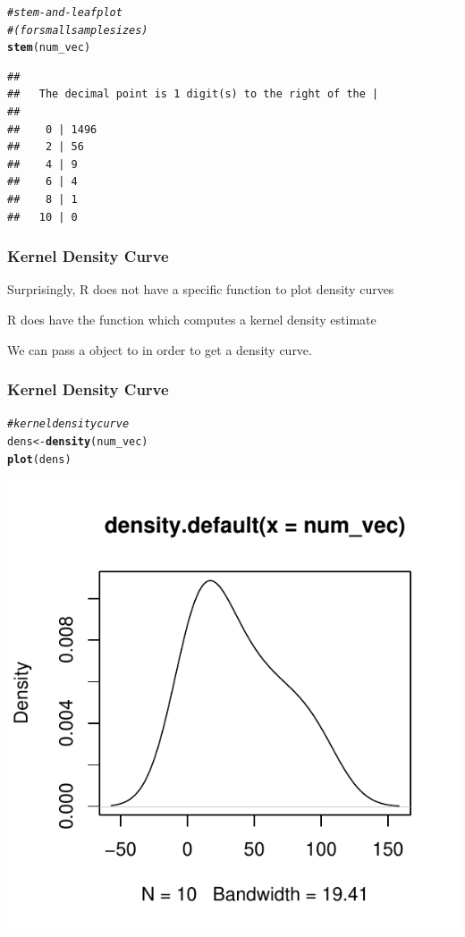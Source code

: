 \documentclass[12pt]{beamer}\usepackage[]{graphicx}\usepackage[]{color}
\makeatletter
\newcommand{\hlcom}[1]{\textcolor[rgb]{0.678,0.584,0.686}{\textit{#1}}}%
\newcommand{\hlstd}[1]{\textcolor[rgb]{0.345,0.345,0.345}{#1}}%
\newcommand{\hlkwb}[1]{\textcolor[rgb]{0.69,0.353,0.396}{#1}}%
\newcommand{\hlkwd}[1]{\textcolor[rgb]{0.737,0.353,0.396}{\textbf{#1}}}%
\newenvironment{kframe}{%
 \def\at@end@of@kframe{}%
 \ifinner\ifhmode%
  \def\at@end@of@kframe{\end{minipage}}%
  \begin{minipage}{\columnwidth}%
 \fi\fi%
 \def\FrameCommand##1{\hskip\@totalleftmargin \hskip-\fboxsep
 \colorbox{shadecolor}{##1}\hskip-\fboxsep
     \hskip-\linewidth \hskip-\@totalleftmargin \hskip\columnwidth}%
 \MakeFramed {\advance\hsize-\width
   \@totalleftmargin\z@ \linewidth\hsize
   \@setminipage}}%
 {\par\unskip\endMakeFramed%
 \at@end@of@kframe}
\newenvironment{knitrout}{}{} %
\makeatother
\begin{document}
\begin{frame}[fragile]
\frametitle{}
\begin{knitrout}\footnotesize
{}\color{fgcolor}\begin{kframe}
\begin{alltt}
\hlcom{# stem-and-leaf plot}
\hlcom{# (for small sample sizes)}
\hlkwd{stem}\hlstd{(num_vec)}
\end{alltt}
\begin{verbatim}
## 
##   The decimal point is 1 digit(s) to the right of the |
## 
##    0 | 1496
##    2 | 56
##    4 | 9
##    6 | 4
##    8 | 1
##   10 | 0
\end{verbatim}
\end{kframe}
\end{knitrout}
\end{frame}


\begin{frame}
\frametitle{Kernel Density Curve}

\bbi
  \item Surprisingly, R does not have a specific function to plot density curves
  \item R does have the  function which computes a kernel density estimate
  \item We can pass a  object to  in order to get a density curve.
\ei

\end{frame}


\begin{frame}[fragile]
\frametitle{Kernel Density Curve}
\begin{knitrout}\footnotesize
{}\color{fgcolor}\begin{kframe}
\begin{alltt}
\hlcom{# kernel density curve}
\hlstd{dens} \hlkwb{<-} \hlkwd{density}\hlstd{(num_vec)}
\hlkwd{plot}\hlstd{(dens)}
\end{alltt}
\end{kframe}

{\centering \includegraphics[width=.5\linewidth,height=.5\linewidth]{figure/unnamed-chunk-5-1} 

}



\end{knitrout}
\end{frame}
\end{document}

